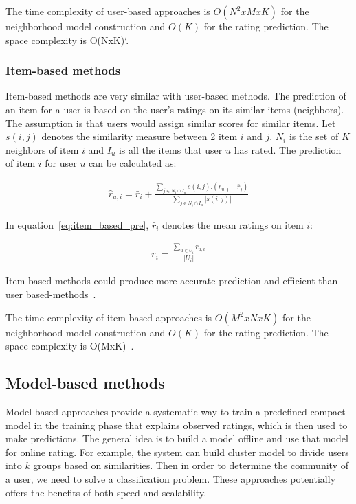 \documentclass[oneside,13pt]{extreport}
\begin{document}
The time complexity of user-based approaches is $O(N^2xMxK)$ for the neighborhood model construction and $O(K)$ for the rating prediction. The  space complexity is O(NxK)`\cite{Chevalier}.

\subsubsection{Item-based methods}
Item-based methods are very similar with user-based methods. The prediction of an item for a user is based on the user’s ratings on its similar items (neighbors). The assumption is that users would assign similar
scores for similar items. Let $s\left( {i,j} \right)$ denotes the similarity measure between 2 item $i$ and $j$. $N_i$ is the set of $K$ neighbors of item $i$ and $I_u$ is all the items that user $u$ has rated. The prediction of item $i$ for user $u$ can be calculated as:

\begin{eqnarray}
\label{eq:item_based_pre}
\hat r_{u,i} = \bar r_i+\frac{{\sum\limits_{j \in {N_i} \cap {I_u}} {{s\left( {i,j} \right)}.({r_{u,j}}-\bar r_j)} }}{{\sum\limits_{j \in {N_i} \cap {I_u}}  {\left| {s\left( {i,j} \right)} \right|} }}
\end{eqnarray}

In equation~\ref{eq:item_based_pre}, $\bar r_i$ denotes the mean ratings on item $i$:

\begin{eqnarray}
\label{eq:mean_rating_item}
\bar r_i = \frac{{\sum\nolimits_{u \in {U_i}} {{r_{u,i}}} }}{{\left| {{U_i}} \right|}}
\end{eqnarray}

Item-based methods could produce more accurate prediction and efficient than user based-methods~\cite{sarwar2001item}.

The time complexity of item-based approaches is $O(M^2xNxK)$ for the neighborhood model construction and $O(K)$ for the rating prediction. The  space complexity is O(MxK)~\cite{Chevalier}.
\subsection{Model-based methods}
Model-based approaches provide a systematic way to train a predefined compact model in the training phase that explains observed ratings, which is then used to make predictions. The general idea is to build a model offline and use that model for online rating. For example, the system can build cluster model to divide users into $k$ groups based on similarities. Then in order to determine the community of a user, we need to solve a classification problem. These approaches potentially offers the benefits of both speed and scalability.
\end{document}
